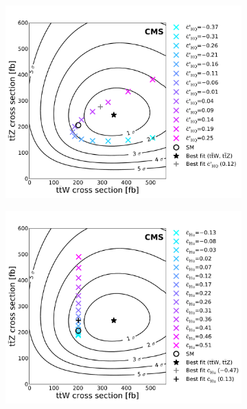 \begin{figure}
\begin{subfigure}{0.5\textwidth}
    \caption{}
  \end{subfigure}
  \begin{subfigure}{0.5\textwidth}
    \includegraphics[width=\textwidth]{figures/eight-TeV/NP/operator_points_color_cycled_cpHQ_ttZ_ttW_2d_v4_mod_print}
    \caption{}
  \end{subfigure}%
  \begin{subfigure}{0.5\textwidth}
    \includegraphics[width=\textwidth]{figures/eight-TeV/NP/operator_points_color_cycled_cHu_ttZ_ttW_2d_v4_mod_print}
    \caption{}
  \end{subfigure}

\end{figure}
